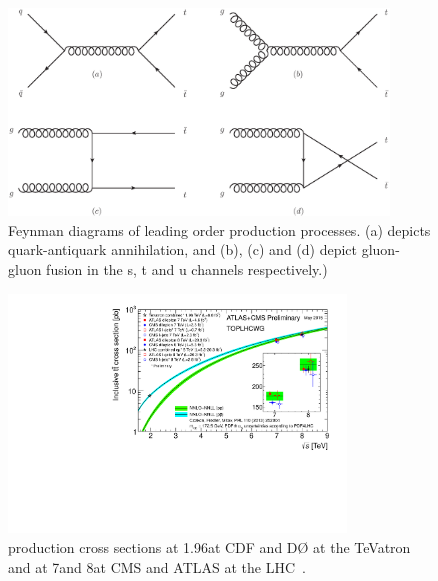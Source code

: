 \begin{figure}[hbtp]
   \centering
     \includegraphics[width=0.9\textwidth]{Chapters/03_Top_Physics/Images/ttbar_production}\hfill
     \caption[Feynman diagrams of leading order \ttbar production processes.]{Feynman diagrams of leading
     order \ttbar production processes. (a) depicts quark-antiquark annihilation, and (b), (c) and (d) depict
     gluon-gluon fusion in the s, t and u channels respectively.)}
     \label{fig:ttbar_production}
\end{figure}

\begin{figure}[hbtp]
   \centering
     \includegraphics[width=0.8\textwidth]{Chapters/03_Top_Physics/Images/toplhcwg_ttxsec_sqrts_may2015}\hfill
     \caption[\ttbar production cross sections at 1.96\TeV at CDF and D{\O} at the TeVatron and at 7\TeV and
     8\TeV at CMS and ATLAS at the LHC.]{\ttbar production cross sections at 1.96\TeV at CDF and D{\O} at the
     TeVatron and at 7\TeV and 8\TeV at CMS and ATLAS at the LHC~\cite{TOPLHC_WG}.}
     \label{fig:ttbar_cross_sections_plot}
\end{figure}




